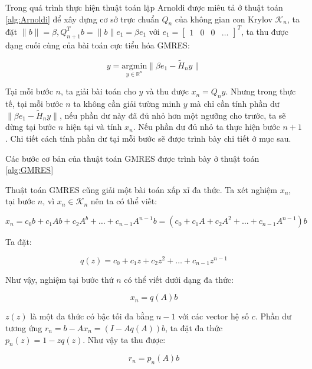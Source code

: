 \documentclass[14pt, a4paper]{article}
\numberwithin{equation}{section}
\numberwithin{algorithm}{section}
\numberwithin{figure}{section}
\numberwithin{dl}{section}
\numberwithin{md}{section}
\numberwithin{bd}{section}
\numberwithin{dn}{section}
\begin{document}
Trong quá trình thực hiện thuật toán lặp Arnoldi được miêu tả ở thuật toán \ref{alg:Arnoldi} để xây dựng cơ sở trực chuẩn $Q_n$ của không gian con Krylov $\mathcal{K}_n$, ta đặt $\lVert b \rVert = \beta, Q_{n+1}^T b=\lVert b \rVert e_1=\beta e_1$ với $e_1 = \begin{bmatrix}
    1 & 0 & 0 & \dots
\end{bmatrix}^T$, ta thu được dạng cuối cùng của bài toán cực tiểu hóa GMRES:

\begin{equation}
    y = \underset{y \in \mathbb{R}^{n}}{\mathrm{argmin}} \lVert \beta e_1 - \widetilde{H}_n y \rVert
\end{equation}

Tại mỗi bước $n$, ta giải bài toán cho $y$ và thu được $x_n = Q_n y$. Nhưng trong thực tế, tại mỗi bước $n$ ta không cần giải tường minh $y$ mà chỉ cần tính phần dư $\lVert \beta e_1 - \widetilde{H}_n y \rVert$, nếu phần dư này đã đủ nhỏ hơn một ngưỡng cho trước, ta sẽ dừng tại bước $n$ hiện tại và tính $x_n$. Nếu phần dư đủ nhỏ ta thực hiện bước $n+1$. Chi tiết cách tính phần dư tại mỗi bước sẽ được trình bày chi tiết ở mục sau.

Các bước cơ bản của thuật toán GMRES được trình bày ở thuật toán \ref{alg:GMRES}

Thuật toán GMRES cũng giải một bài toán xấp xỉ đa thức. Ta xét nghiệm $x_n$, tại bước $n$, vì $x_n \in \mathcal{K}_n$ nên ta có thể viết:

\begin{equation}
    x_n = c_0 b + c_1 A b + c_2 A^b + \dots + c_{n-1}A^{n-1}b=(c_0 + c_1 A + c_2 A^2 + \dots + c_{n-1} A^{n-1})b
\end{equation}

Ta đặt:

\begin{equation}
    q(z) = c_0 + c_1 z + c_2 z^2 + \dots + c_{n-1}z^{n-1}
\end{equation}

Như vậy, nghiệm tại bước thứ $n$ có thể viết dưới dạng đa thức:

\begin{equation}
    x_n = q(A)b
\end{equation}

$z(z)$ là một đa thức có bậc tối đa bằng $n-1$ với các vector hệ số $c$. Phần dư tương ứng $r_n=b - Ax_n=(I - Aq(A))b$, ta đặt đa thức $p_n(z) = 1 - z q(z)$. Như vậy ta thu được:

\begin{equation} \label{eq:Polynomial-Approximation}
    r_n = p_n(A)b
\end{equation}
\end{document}
